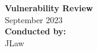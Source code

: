\documentclass[12pt]{article}
\begin{document}
\begin{titlepage}
    \centering
    \vfill
    {\bfseries\Huge
        Vulnerability Review\\
    }
    \vspace{0.5cm}
    {\Large
        September 2023\\
    }
    \vspace{0.5cm}
    {\bfseries\LARGE
        Conducted by:\\
    }
    {\LARGE
        JLaw\\
    }
    \vfill
\end{titlepage}

\tableofcontents
\newpage
\end{document}
